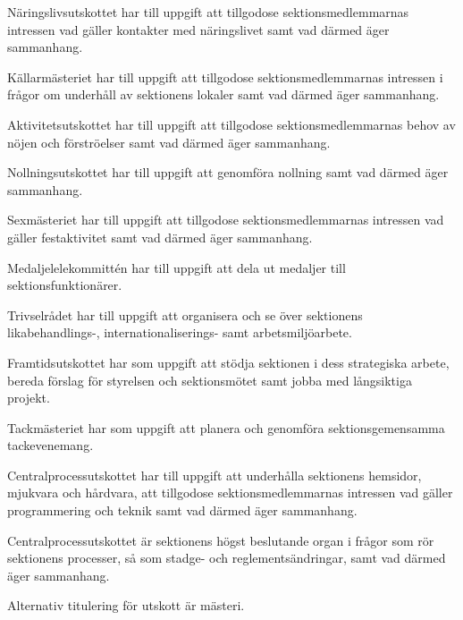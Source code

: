 \documentclass[stadgar]{dsekprotokoll}
\begin{document}
\begin{stadgeavsnitt}
Näringslivsutskottet har till uppgift att tillgodose sektionsmedlemmarnas
intressen vad gäller kontakter med näringslivet samt vad därmed äger
sammanhang.


Källarmästeriet har till uppgift att tillgodose sektionsmedlemmarnas intressen i frågor om underhåll av sektionens lokaler samt vad därmed äger sammanhang.


Aktivitetsutskottet har till uppgift att tillgodose sektionsmedlemmarnas behov
av nöjen och förströelser samt vad därmed äger sammanhang.


Nollningsutskottet har till uppgift att genomföra nollning samt vad därmed äger sammanhang.


Sexmästeriet har till uppgift att tillgodose sektionsmedlemmarnas intressen
vad gäller festaktivitet samt vad därmed äger sammanhang.


Medaljelelekommittén har till uppgift att dela ut medaljer till
sektionsfunktionärer.


Trivselrådet har till uppgift att organisera och se över sektionens likabehandlings-, internationaliserings- samt arbetsmiljöarbete.


Framtidsutskottet har som uppgift att stödja sektionen i dess strategiska arbete, bereda förslag för styrelsen och sektionsmötet samt jobba med långsiktiga projekt.


Tackmästeriet har som uppgift att planera och genomföra sektionsgemensamma tackevenemang.


Centralprocessutskottet har till uppgift att underhålla sektionens
hemsidor, mjukvara och hårdvara, att tillgodose sektionsmedlemmarnas intressen vad gäller programmering och teknik samt
vad därmed äger sammanhang.

Centralprocessutskottet är sektionens högst beslutande organ i frågor som rör sektionens processer, så som stadge- och reglementsändringar, samt vad därmed äger sammanhang.


Alternativ titulering för utskott är mästeri.

\end{stadgeavsnitt}
\end{document}
